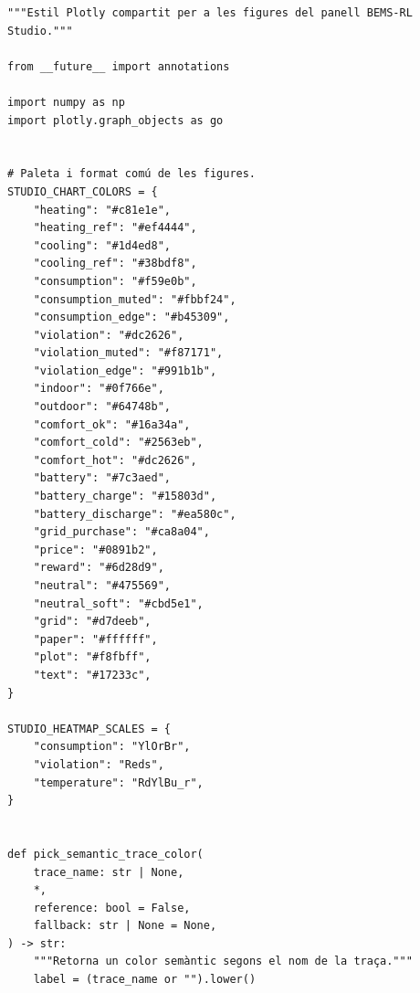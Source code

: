 \documentclass[10pt,a4paper]{article}
\begin{document}
\begin{lstlisting}[style=studioPython,caption={backend/grafics/style.py},label={lst:backend-grafics-style-py}]
"""Estil Plotly compartit per a les figures del panell BEMS-RL Studio."""

from __future__ import annotations

import numpy as np
import plotly.graph_objects as go


# Paleta i format comú de les figures.
STUDIO_CHART_COLORS = {
    "heating": "#c81e1e",
    "heating_ref": "#ef4444",
    "cooling": "#1d4ed8",
    "cooling_ref": "#38bdf8",
    "consumption": "#f59e0b",
    "consumption_muted": "#fbbf24",
    "consumption_edge": "#b45309",
    "violation": "#dc2626",
    "violation_muted": "#f87171",
    "violation_edge": "#991b1b",
    "indoor": "#0f766e",
    "outdoor": "#64748b",
    "comfort_ok": "#16a34a",
    "comfort_cold": "#2563eb",
    "comfort_hot": "#dc2626",
    "battery": "#7c3aed",
    "battery_charge": "#15803d",
    "battery_discharge": "#ea580c",
    "grid_purchase": "#ca8a04",
    "price": "#0891b2",
    "reward": "#6d28d9",
    "neutral": "#475569",
    "neutral_soft": "#cbd5e1",
    "grid": "#d7deeb",
    "paper": "#ffffff",
    "plot": "#f8fbff",
    "text": "#17233c",
}

STUDIO_HEATMAP_SCALES = {
    "consumption": "YlOrBr",
    "violation": "Reds",
    "temperature": "RdYlBu_r",
}


def pick_semantic_trace_color(
    trace_name: str | None,
    *,
    reference: bool = False,
    fallback: str | None = None,
) -> str:
    """Retorna un color semàntic segons el nom de la traça."""
    label = (trace_name or "").lower()


\end{lstlisting}
\end{document}
